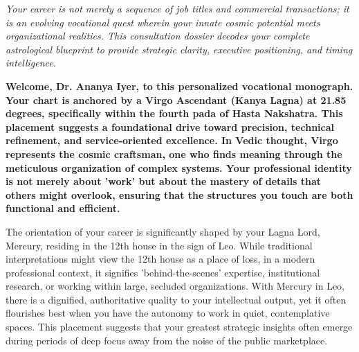 


{\fontsize{9.5}{14}\selectfont\color{DeepSlate}\itshape Your career is not merely a sequence of job titles and commercial transactions; it is an evolving vocational quest wherein your innate cosmic potential meets organizational realities. This consultation dossier decodes your complete astrological blueprint to provide strategic clarity, executive positioning, and timing intelligence.}\par\vspace{3.5mm}

\label{topic1}

{\fontsize{9.5}{13.8}\selectfont\bfseries\color{DeepSlate} Welcome, Dr. Ananya Iyer, to this personalized vocational monograph. Your chart is anchored by a Virgo Ascendant (Kanya Lagna) at 21.85 degrees, specifically within the fourth pada of Hasta Nakshatra. This placement suggests a foundational drive toward precision, technical refinement, and service-oriented excellence. In Vedic thought, Virgo represents the cosmic craftsman, one who finds meaning through the meticulous organization of complex systems. Your professional identity is not merely about 'work' but about the mastery of details that others might overlook, ensuring that the structures you touch are both functional and efficient.}\par\vspace{2mm}

{\fontsize{9}{13}\selectfont The orientation of your career is significantly shaped by your Lagna Lord, Mercury, residing in the 12th house in the sign of Leo. While traditional interpretations might view the 12th house as a place of loss, in a modern professional context, it signifies 'behind-the-scenes' expertise, institutional research, or working within large, secluded organizations. With Mercury in Leo, there is a dignified, authoritative quality to your intellectual output, yet it often flourishes best when you have the autonomy to work in quiet, contemplative spaces. This placement suggests that your greatest strategic insights often emerge during periods of deep focus away from the noise of the public marketplace.}\par\vspace{1.8mm}

